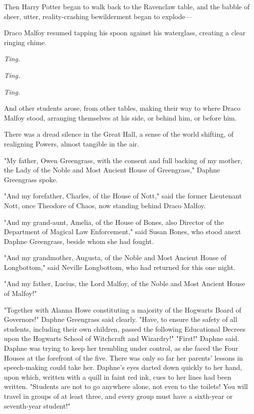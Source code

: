 Then Harry Potter began to walk back to the Ravenclaw table, and the babble of sheer, utter, reality-crashing bewilderment began to explode---

Draco Malfoy resumed tapping his spoon against his waterglass, creating a clear ringing chime.

\emph{Ting.}

\emph{Ting.}

\emph{Ting.}

And other students arose, from other tables, making their way to where Draco Malfoy stood, arranging themselves at his side, or behind him, or before him.

There was a dread silence in the Great Hall, a sense of the world shifting, of realigning Powers, almost tangible in the air.

"My father, Owen Greengrass, with the consent and full backing of my mother, the Lady of the Noble and Most Ancient House of Greengrass," Daphne Greengrass spoke.

"And my forefather, Charles, of the House of Nott," said the former Lieutenant Nott, once Theodore of Chaos, now standing behind Draco Malfoy.

"And my grand-aunt, Amelia, of the House of Bones, also Director of the Department of Magical Law Enforcement," said Susan Bones, who stood anext Daphne Greengrass, beside whom she had fought.

"And my grandmother, Augusta, of the Noble and Most Ancient House of Longbottom," said Neville Longbottom, who had returned for this one night.

"And my father, Lucius, the Lord Malfoy, of the Noble and Most Ancient House of Malfoy!"

"Together with Alanna Howe constituting a majority of the Hogwarts Board of Governors!" Daphne Greengrass said clearly. "Have, to ensure the safety of all students, including their own children, passed the following Educational Decrees upon the Hogwarts School of Witchcraft and Wizardry!"
\sbreak
"First!" Daphne said. Daphne was trying to keep her trembling under control, as she faced the Four Houses at the forefront of the five. There was only so far her parents' lessons in speech-making could take her. Daphne's eyes darted down quickly to her hand, upon which, written with a quill in faint red ink, cues to her lines had been written. "Students are not to go anywhere alone, not even to the toilets! You will travel in groups of at least three, and every group must have a sixth-year or seventh-year student!"

